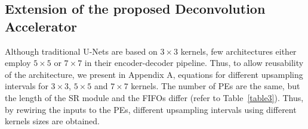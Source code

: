 \documentclass[journal]{IEEEtran}
\begin{document}
\begin{table}[h]
\caption{Comparison with other deconvolution architectures employing  $5 \times 5$ kernel}
\label{table23}
\end{table}

\subsection{Extension of the proposed Deconvolution Accelerator}\label{sec:Extension of the proposed Deconvolution Accelerator}
Although traditional U-Nets are based on $3 \times 3$ \cite{article23}  kernels, few architectures either employ $5\times5$ \cite{article18} or $7\times7$  \cite{article7} in their encoder-decoder pipeline. Thus, to allow reusability of the architecture, we present in Appendix A, equations for different upsampling intervals for $3\times3$, $5\times5$ and $7\times7$ kernels. The number of PEs are the same, but the length of the SR module and the FIFOs differ (refer to Table~\ref{table3}). Thus, by rewiring the inputs to the PEs, different upsampling intervals using different kernels sizes are obtained. 
\end{document}
